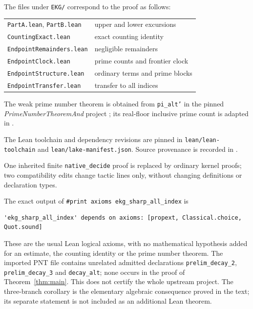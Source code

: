 The files under \texttt{EKG/} correspond to the proof as follows:
\begin{center}\small
\begin{tabular}{ll}
\texttt{PartA.lean}, \texttt{PartB.lean} & upper and lower excursions\\
\texttt{CountingExact.lean} & exact counting identity\\
\texttt{EndpointRemainders.lean} & negligible remainders\\
\texttt{EndpointClock.lean} & prime counts and frontier clock\\
\texttt{EndpointStructure.lean} & ordinary terms and prime blocks\\
\texttt{EndpointTransfer.lean} & transfer to all indices
\end{tabular}
\end{center}
The weak prime number theorem is obtained from
\texttt{pi\_alt'} in the pinned \emph{PrimeNumberTheoremAnd}
project \cite{pntcode}; its real-floor inclusive prime count is
adapted in .

The Lean toolchain and dependency revisions are pinned in
\texttt{lean/lean-toolchain} and \texttt{lean/lake-manifest.json}.
Source provenance is recorded in
.

One inherited finite \texttt{native\_decide} proof is replaced by
ordinary kernel proofs; two compatibility edits change tactic lines
only, without changing definitions or declaration types.

The exact output of \texttt{\#print axioms ekg\_sharp\_all\_index} is
\begingroup\small
\begin{verbatim}
'ekg_sharp_all_index' depends on axioms: [propext, Classical.choice, Quot.sound]
\end{verbatim}
\endgroup
These are the usual Lean logical axioms, with no mathematical
hypothesis added for an estimate, the counting identity or the prime
number theorem.
The imported PNT file contains unrelated admitted declarations
\texttt{prelim\_decay\_2}, \texttt{prelim\_decay\_3} and \texttt{decay\_alt};
none occurs in the proof of Theorem~\ref{thm:main}. This does not certify the whole
upstream project. The three-branch corollary is the elementary algebraic
consequence proved in the text; its separate statement is not included
as an additional Lean theorem.

